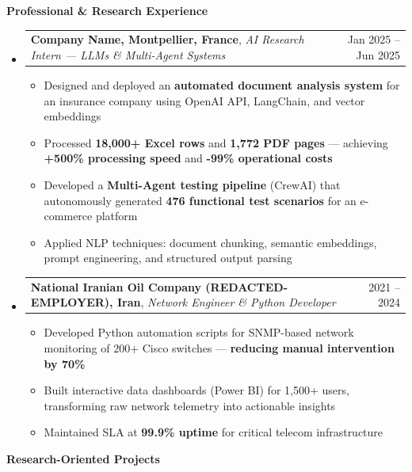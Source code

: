 \documentclass[11pt,a4paper]{article}
\makeatletter
\newcommand{\itemspace}{\vspace{0.4em}}
\newcommand{\sectionspace}{\itemspace}
\newcommand{\subspace}{\vspace{0.5em}}
\newcommand{\cvsection}[1]{
    \sectionspace
    \noindent\textcolor{primary}{\Large \textbf{#1}} \textcolor{primary}{\hrulefill}
    \par\vspace{0.4em}
}
\newcommand{\headerrow}[2]{
    \begin{tabular*}{\linewidth}{l@{\extracolsep{\fill}}r}
    #1 & \textcolor{primary}{#2} \\
    \end{tabular*}
}
\makeatother
\begin{document}
\cvsection{Professional \& Research Experience}
\begin{itemize}[leftmargin=1em, label={}]
    \item
    \headerrow{\textbf{Company Name, Montpellier, France}, \emph{AI Research Intern — LLMs \& Multi-Agent Systems}}{Jan 2025 -- Jun 2025}
    \begin{itemize}[leftmargin=1.5em, label=$\bullet$, nosep]
        \item Designed and deployed an \textbf{automated document analysis system} for an insurance company using OpenAI API, LangChain, and vector embeddings
        \item Processed \textbf{18,000+ Excel rows} and \textbf{1,772 PDF pages} — achieving \textbf{+500\% processing speed} and \textbf{-99\% operational costs}
        \item Developed a \textbf{Multi-Agent testing pipeline} (CrewAI) that autonomously generated \textbf{476 functional test scenarios} for an e-commerce platform
        \item Applied NLP techniques: document chunking, semantic embeddings, prompt engineering, and structured output parsing
    \end{itemize}

    \subspace 
    \item
    \headerrow{\textbf{National Iranian Oil Company (REDACTED-EMPLOYER), Iran}, \emph{Network Engineer \& Python Developer}}{2021 -- 2024}
    \begin{itemize}[leftmargin=1.5em, label=$\bullet$, nosep]
        \item Developed Python automation scripts for SNMP-based network monitoring of 200+ Cisco switches — \textbf{reducing manual intervention by 70\%}
        \item Built interactive data dashboards (Power BI) for 1,500+ users, transforming raw network telemetry into actionable insights
        \item Maintained SLA at \textbf{99.9\% uptime} for critical telecom infrastructure
    \end{itemize}
\end{itemize}

\clearpage
\cvsection{Research-Oriented Projects}
\end{document}
